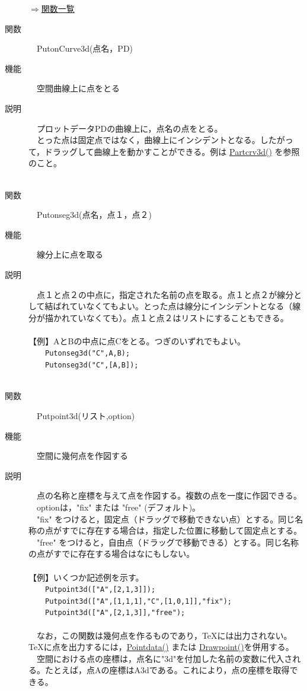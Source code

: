 \documentclass[papersize,a4paper,12pt,uplatex]{jsarticle}
\begin{document}
\begin{description}
\begin{flushright} \hyperlink{functionlist3d}{$\Rightarrow$関数一覧}\end{flushright}

\hypertarget{putonCurve3d}{}
\item[関数]　PutonCurve3d(点名，PD)
\item[機能]　空間曲線上に点をとる
\item[説明]　プロットデータPDの曲線上に，点名の点をとる。\\
　とった点は固定点ではなく，曲線上にインシデントとなる。したがって，ドラッグして曲線上を動かすことができる。例は \hyperlink{partcrv3d}{Partcrv3d()} を参照のこと。\\
　\\

\hypertarget{putonseg3d}{}
\item[関数]　Putonseg3d(点名，点１，点２)
\item[機能]　線分上に点を取る
\item[説明]　点１と点２の中点に，指定された名前の点を取る。点１と点２が線分として結ばれていなくてもよい。とった点は線分にインシデントとなる（線分が描かれていなくても）。点１と点２はリストにすることもできる。\\
　\\
【例】AとBの中点に点Cをとる。つぎのいずれでもよい。\\
　　\verb|Putonseg3d("C",A,B);|\\
　　\verb|Putonseg3d("C",[A,B]);|\\
　\\

\hypertarget{putpoint3d}{}
\item[関数]　Putpoint3d(リスト,option)
\item[機能]　空間に幾何点を作図する
\item[説明]　点の名称と座標を与えて点を作図する。複数の点を一度に作図できる。\\
　optionは，"fix" または "free" (デフォルト)。\\
　"fix" をつけると，固定点（ドラッグで移動できない点）とする。同じ名称の点がすでに存在する場合は，指定した位置に移動して固定点とする。\\
　"free" をつけると，自由点（ドラッグで移動できる）とする。同じ名称の点がすでに存在する場合はなにもしない。\\
　\\
【例】いくつか記述例を示す。\\
　　\verb|Putpoint3d(["A",[2,1,3]]);|\\
　　\verb|Putpoint3d(["A",[1,1,1],"C",[1,0,1]],"fix");|\\
　　\verb|Putpoint3d(["A",[2,1,3]],"free");|\\
　\\
　なお，この関数は幾何点を作るものであり，TeXには出力されない。TeXに点を出力するには，\hyperlink{pointdata}{Pointdata()} または \hyperlink{drwpt}{Drawpoint()}を併用する。\\
　空間における点の座標は，点名に"3d"を付加した名前の変数に代入される。たとえば，点Aの座標はA3dである。これにより，点の座標を取得できる。


\end{description}
\end{document}

